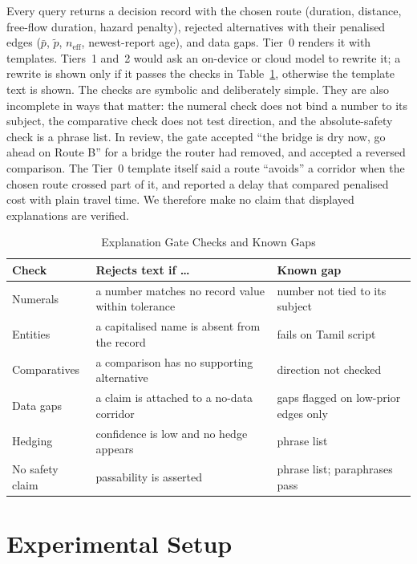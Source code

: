 \documentclass[conference]{IEEEtran}
\begin{document}
Every query returns a decision record with the chosen route (duration, distance, free-flow duration, hazard penalty), rejected alternatives with their penalised edges ($\bar p$, $\tilde p$, $n_{\mathrm{eff}}$, newest-report age), and data gaps. Tier~0 renders it with templates. Tiers~1 and~2 would ask an on-device or cloud model to rewrite it; a rewrite is shown only if it passes the checks in Table~\ref{tab:rules}, otherwise the template text is shown. The checks are symbolic and deliberately simple. They are also incomplete in ways that matter: the numeral check does not bind a number to its subject, the comparative check does not test direction, and the absolute-safety check is a phrase list. In review, the gate accepted ``the bridge is dry now, go ahead on Route B'' for a bridge the router had removed, and accepted a reversed comparison. The Tier~0 template itself said a route ``avoids'' a corridor when the chosen route crossed part of it, and reported a delay that compared penalised cost with plain travel time. We therefore make no claim that displayed explanations are verified.

\begin{table}[t]
\centering
\caption{Explanation Gate Checks and Known Gaps}
\label{tab:rules}
\footnotesize
\begin{tabular}{>{\raggedright\arraybackslash}p{1.45cm}>{\raggedright\arraybackslash}p{3.3cm}>{\raggedright\arraybackslash}p{2.9cm}}
\toprule
Check & Rejects text if \ldots & Known gap\\
\midrule
Numerals & a number matches no record value within tolerance & number not tied to its subject\\
Entities & a capitalised name is absent from the record & fails on Tamil script\\
Comparatives & a comparison has no supporting alternative & direction not checked\\
Data gaps & a claim is attached to a no-data corridor & gaps flagged on low-prior edges only\\
Hedging & confidence is low and no hedge appears & phrase list\\
No safety claim & passability is asserted & phrase list; paraphrases pass\\
\bottomrule
\end{tabular}
\end{table}

\section{Experimental Setup}\label{sec:setup}
\end{document}
